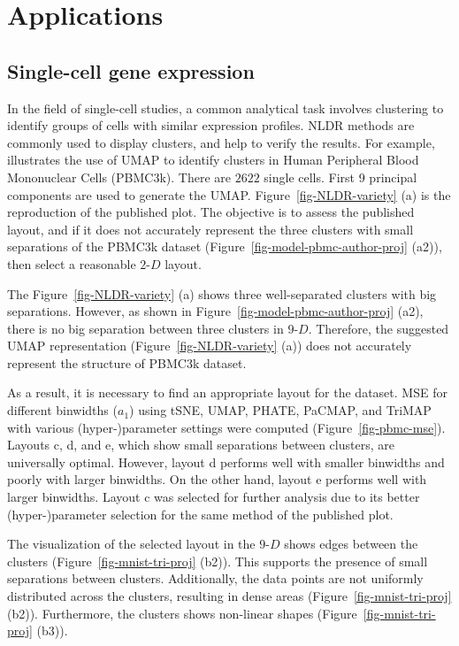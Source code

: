 \documentclass[
  12pt]{article}
\newcommand\gD{$2\text{-}D$}
\begin{document}
\section{Applications}\label{sec-applications}

\subsection{Single-cell gene
expression}\label{single-cell-gene-expression}

In the field of single-cell studies, a common analytical task involves
clustering to identify groups of cells with similar expression profiles.
NLDR methods are commonly used to display clusters, and help to verify
the results. For example, \citet{chen2023} illustrates the use of UMAP
to identify clusters in Human Peripheral Blood Mononuclear Cells
(PBMC3k). There are \(2622\) single cells. First 9 principal components
are used to generate the UMAP. Figure~\ref{fig-NLDR-variety} (a) is the
reproduction of the published plot. The objective is to assess the
published layout, and if it does not accurately represent the three
clusters with small separations of the PBMC3k dataset
(Figure~\ref{fig-model-pbmc-author-proj} (a2)), then select a reasonable
\gD{} layout.

The Figure~\ref{fig-NLDR-variety} (a) shows three well-separated
clusters with big separations. However, as shown in
Figure~\ref{fig-model-pbmc-author-proj} (a2), there is no big separation
between three clusters in \(9\text{-}D\). Therefore, the suggested UMAP
representation (Figure~\ref{fig-NLDR-variety} (a)) does not accurately
represent the structure of PBMC3k dataset.

As a result, it is necessary to find an appropriate layout for the
dataset. MSE for different binwidths (\(a_1\)) using tSNE, UMAP, PHATE,
PaCMAP, and TriMAP with various (hyper-)parameter settings were computed
(Figure~\ref{fig-pbmc-mse}). Layouts c, d, and e, which show small
separations between clusters, are universally optimal. However, layout d
performs well with smaller binwidths and poorly with larger binwidths.
On the other hand, layout e performs well with larger binwidths. Layout
c was selected for further analysis due to its better (hyper-)parameter
selection for the same method of the published plot.

The visualization of the selected layout in the \(9\text{-}D\) shows
edges between the clusters (Figure~\ref{fig-mnist-tri-proj} (b2)). This
supports the presence of small separations between clusters.
Additionally, the data points are not uniformly distributed across the
clusters, resulting in dense areas (Figure~\ref{fig-mnist-tri-proj}
(b2)). Furthermore, the clusters shows non-linear shapes
(Figure~\ref{fig-mnist-tri-proj} (b3)).
\end{document}
